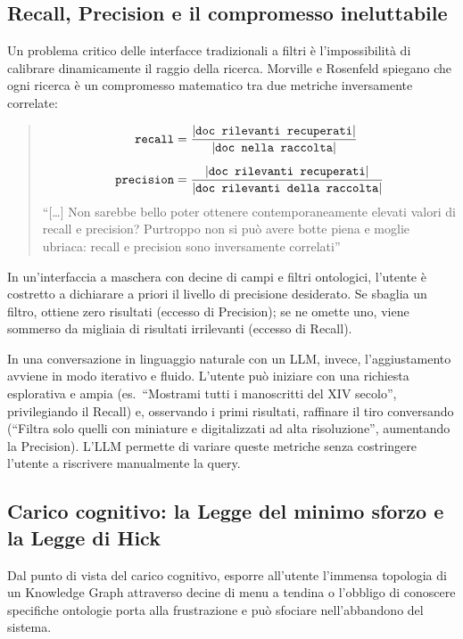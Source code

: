     \subsection{Recall, Precision e il compromesso ineluttabile}\label{subsec:recall_precision}

    Un problema critico delle interfacce tradizionali a filtri è l'impossibilità di calibrare dinamicamente il raggio della ricerca. Morville e Rosenfeld spiegano che ogni ricerca è un compromesso matematico tra due metriche inversamente correlate:

    \begin{quotation}
        \begin{align*}
            \texttt{recall} &= \frac{|\texttt{doc rilevanti recuperati}|}{|\texttt{doc nella raccolta}|}\\[5pt]
            \texttt{precision} &= \frac{|\texttt{doc rilevanti recuperati}|}{|\texttt{doc rilevanti della raccolta}|}
        \end{align*}
        ``[\ldots] Non sarebbe bello poter ottenere contemporaneamente elevati valori di recall e precision? Purtroppo non si può avere botte piena e moglie ubriaca: recall e precision sono inversamente correlati''\hfill\cite{Mor08}
    \end{quotation}

    In un'interfaccia a maschera con decine di campi e filtri ontologici, l'utente è costretto a dichiarare a priori il livello di precisione desiderato. Se sbaglia un filtro, ottiene zero risultati (eccesso di Precision); se ne omette uno, viene sommerso da migliaia di risultati irrilevanti (eccesso di Recall).

    In una conversazione in linguaggio naturale con un LLM, invece, l'aggiustamento avviene in modo iterativo e fluido. L'utente può iniziare con una richiesta esplorativa e ampia (es.\ ``Mostrami tutti i manoscritti del XIV secolo'', privilegiando il Recall) e, osservando i primi risultati, raffinare il tiro conversando (``Filtra solo quelli con miniature e digitalizzati ad alta risoluzione'', aumentando la Precision). L'LLM permette di variare queste metriche senza costringere l'utente a riscrivere manualmente la query.

    \subsection{Carico cognitivo: la Legge del minimo sforzo e la Legge di Hick}\label{subsec:cognitive_load}

    Dal punto di vista del carico cognitivo, esporre all'utente l'immensa topologia di un Knowledge Graph attraverso decine di menu a tendina o l'obbligo di conoscere specifiche ontologie porta alla frustrazione e può sfociare nell'abbandono del sistema.

